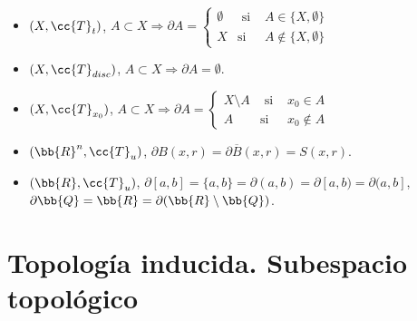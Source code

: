 \begin{ejemplo}\
    \begin{itemize}
        \item $(X, \cc{T}_t)$, $A\subset X \Rightarrow \partial A = \left\{
        \begin{array}{ccc}
            \emptyset & \text{ si } & A \in \{X, \emptyset\}\\
            X & \text{si} & A\notin \{X, \emptyset\}
        \end{array}
        \right.$
        \item $(X, \cc{T}_{disc})$, $A\subset X \Rightarrow \partial A = \emptyset$.
        \item $(X, \cc{T}_{x_0})$, $A\subset X \Rightarrow \partial A = \left\{
        \begin{array}{ccc}
            X\setminus A & \text{ si } & x_0\in A\\
            A & \text{si} & x_0 \notin A
        \end{array}
        \right.$
        \item $(\bb{R}^n, \cc{T}_u)$, $\partial B(x, r) = \partial \overline{B}(x,r) = S(x,r)$.
        \item $(\bb{R}, \cc{T}_u)$, $\partial [a,b] = \{a,b\} = \partial (a,b) = \partial [a,b) = \partial (a,b]$, $\partial \bb{Q} = \bb{R} = \partial(\bb{R}\setminus \bb{Q})$.
    \end{itemize}
    \endsquare
\end{ejemplo}

\section{Topología inducida. Subespacio topológico}


